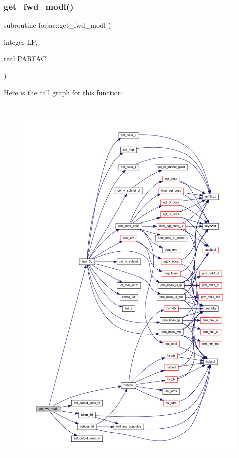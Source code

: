 \subsubsection{\texorpdfstring{get\+\_\+fwd\+\_\+modl()}{get\_fwd\_modl()}}
{\footnotesize\ttfamily subroutine forjac\+::get\+\_\+fwd\+\_\+modl (\begin{DoxyParamCaption}\item[{integer}]{LP,  }\item[{real}]{P\+A\+R\+F\+AC }\end{DoxyParamCaption})}

Here is the call graph for this function\+:\nopagebreak
\begin{figure}[H]
\begin{center}
\leavevmode
\includegraphics[height=550pt]{Leroi_8f90_a38a723748e0c805e5dfbd851b9c62b3e_cgraph}
\end{center}
\end{figure}

